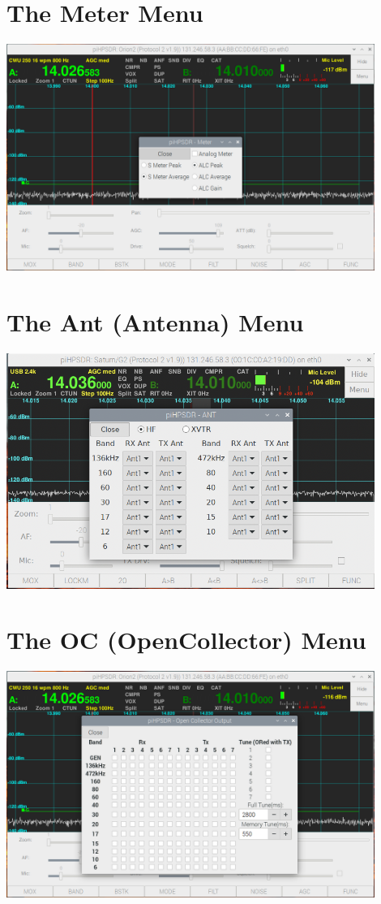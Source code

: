 \documentclass[12pt]{book}
\begin{document}
\section{The Meter Menu}
\begin{center}
\includegraphics[width=12cm]{MeterMenu.png}
\end{center}

\section{The Ant (Antenna) Menu}
\begin{center}
\includegraphics[width=12cm]{AntMenu.png}
\end{center}
 
\section{The OC (OpenCollector) Menu}
\begin{center}
\includegraphics[width=12cm]{OCMenu.png}
\end{center}
\end{document}
